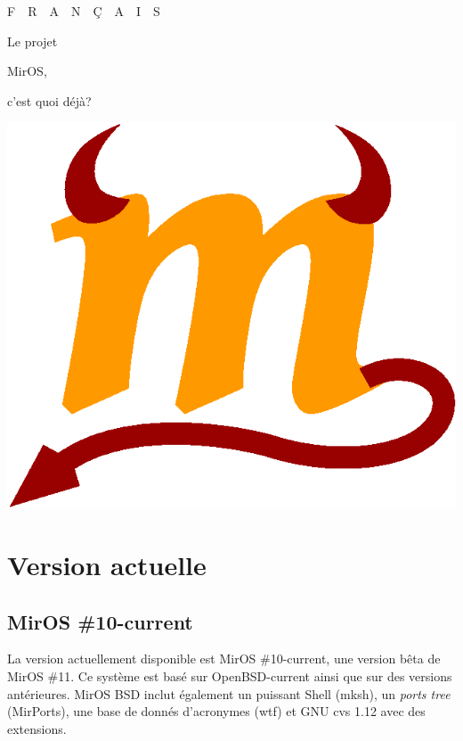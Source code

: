 \documentclass[a4paper,landscape,11pt,notumble]{leaflet}
\begin{document}

\graybox
\begin{center}
{\noindent{}%
\quad F~~R~~A~~N~~\c C~~A~~I~~S\par}
\vfill

\fontsize{48}{56}\selectfont Le projet\par
\fontsize{64}{64}\selectfont MirOS,\par
\fontsize{48}{56}\selectfont c'est quoi déjà?\par

\vfill

\includegraphics[width=0.75\columnwidth]{img/m-color}

\vfill%
\end{center}%
\graybox

\newpage

\section{Version actuelle}

\subsection{MirOS \#10-current}

\noindent
La version actuellement disponible est MirOS \#10-current, une version bêta de MirOS \#11. Ce système est basé sur OpenBSD-current ainsi que sur des versions antérieures. MirOS BSD inclut également un puissant Shell (mksh), un \emph{ports tree} (MirPorts), une base de donnés d’acronymes (wtf) et GNU cvs 1.12 avec des extensions. 
\end{document}
